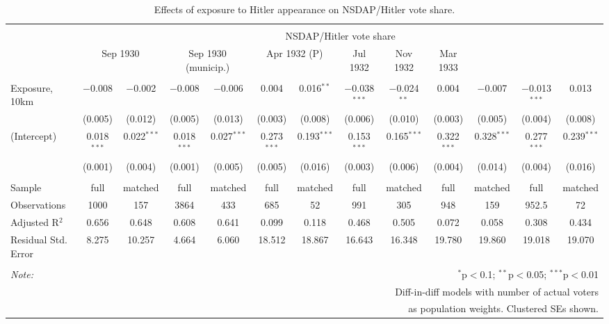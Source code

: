 
\begin{table}[!htbp] \centering 
  \caption{Effects of exposure to Hitler appearance on NSDAP/Hitler vote share.} 
  \label{tab:nsdap-voteshare-dd-1} 
\begin{tabular}{@{\extracolsep{5pt}}lcccccccccccc} 
\\[-1.8ex]\hline 
\hline \\[-1.8ex] 
 & \multicolumn{12}{c}{NSDAP/Hitler vote share} \\ 
\cline{2-13} 
 & \multicolumn{2}{c}{Sep 1930} & \multicolumn{2}{c}{Sep 1930 (municip.)} & \multicolumn{2}{c}{Apr 1932 (P)} & Jul 1932 & Nov 1932 & Mar 1933 &  &  &  \\ 
\hline \\[-1.8ex] 
 Exposure, 10km & $-$0.008 & $-$0.002 & $-$0.008 & $-$0.006 & 0.004 & 0.016$^{**}$ & $-$0.038$^{***}$ & $-$0.024$^{**}$ & 0.004 & $-$0.007 & $-$0.013$^{***}$ & 0.013 \\ 
  & (0.005) & (0.012) & (0.005) & (0.013) & (0.003) & (0.008) & (0.006) & (0.010) & (0.003) & (0.005) & (0.004) & (0.008) \\ 
  (Intercept) & 0.018$^{***}$ & 0.022$^{***}$ & 0.018$^{***}$ & 0.027$^{***}$ & 0.273$^{***}$ & 0.193$^{***}$ & 0.153$^{***}$ & 0.165$^{***}$ & 0.322$^{***}$ & 0.328$^{***}$ & 0.277$^{***}$ & 0.239$^{***}$ \\ 
  & (0.001) & (0.004) & (0.001) & (0.005) & (0.005) & (0.016) & (0.003) & (0.006) & (0.004) & (0.014) & (0.004) & (0.016) \\ 
 \hline \\[-1.8ex] 
Sample & full & matched & full & matched & full & matched & full & matched & full & matched & full & matched \\ 
Observations & 1000 & 157 & 3864 & 433 & 685 & 52 & 991 & 305 & 948 & 159 & 952.5 & 72 \\ 
Adjusted R$^{2}$ & 0.656 & 0.648 & 0.608 & 0.641 & 0.099 & 0.118 & 0.468 & 0.505 & 0.072 & 0.058 & 0.308 & 0.434 \\ 
Residual Std. Error & 8.275 & 10.257 & 4.664 & 6.060 & 18.512 & 18.867 & 16.643 & 16.348 & 19.780 & 19.860 & 19.018 & 19.070 \\ 
\hline 
\hline \\[-1.8ex] 
\textit{Note:}  & \multicolumn{12}{r}{$^{*}$p$<$0.1; $^{**}$p$<$0.05; $^{***}$p$<$0.01} \\ 
 & \multicolumn{12}{r}{Diff-in-diff models with number of actual voters} \\ 
 & \multicolumn{12}{r}{as population weights. Clustered SEs shown.} \\ 
\end{tabular} 
\end{table} 
